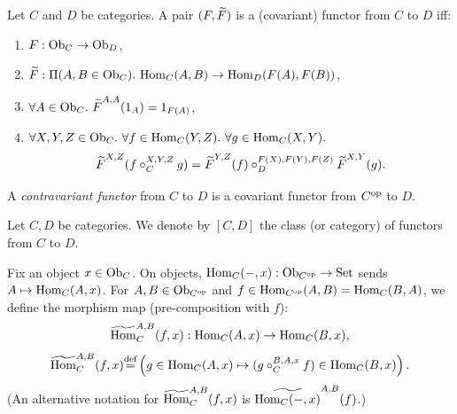 \documentclass[10pt,a4paper]{article}
\begin{document}
\begin{definition}
Let $C$ and $D$ be categories. A pair $(F, {\widetilde{F}\textrm{}})$ is a (covariant) functor from $C$ to $D$ iff:
\begin{enumerate}
\item $F : {\textrm{Ob}}_C \to {\textrm{Ob}}_D$,
\item $\FMor : \Pi(A, B \in \Ob_C).\ \Hom_C(A,B) \to \Hom_D(F(A), F(B))$,
\item $\forall A\in \Ob_C.\ \FMor^{A,A}(1_A)=1_{F(A)}$,
\item $\forall X,Y,Z \in {\textrm{Ob}}_C.\ \forall f\in{\textrm{Hom}}_C(Y,Z).\ \forall g\in{\textrm{Hom}}_C(X,Y).$
$${\widetilde{F}\textrm{}}^{X,Z}(f\circ_C^{X,Y,Z} g)={\widetilde{F}\textrm{}}^{Y,Z}(f)\circ_D^{F(X),F(Y),F(Z)} {\widetilde{F}\textrm{}}^{X,Y}(g).$$
\end{enumerate}
A \emph{contravariant functor} from $C$ to $D$ is a covariant functor from $C^{\textrm{op}}$ to $D$.
\end{definition}

\begin{definition}
Let $C, D$ be categories. We denote by $[C,D]$ the class (or category) of functors from $C$ to $D$.
\end{definition}

\begin{definition}
Fix an object $x \in {\textrm{Ob}}_C$. On objects, ${\textrm{Hom}}_C(-,x) : {\textrm{Ob}}_{C^{\textrm{op}}} \to {\textrm{Set}}$ sends $A \mapsto {\textrm{Hom}}_C(A,x)$.
For $A,B \in {\textrm{Ob}}_{C^{\textrm{op}}}$ and $f \in {\textrm{Hom}}_{C^{\textrm{op}}}(A,B) = {\textrm{Hom}}_C(B,A)$, we define the morphism map (pre-composition with $f$):
$${\widetilde{{\textrm{Hom}}}\textrm{}}^{A,B}_C(f,x) : {\textrm{Hom}}_C(A,x) \to {\textrm{Hom}}_C(B,x),$$
$${\widetilde{{\textrm{Hom}}}\textrm{}}^{A,B}_C(f,x) {\stackrel{{\textrm{def}}}{=}} \left(g \in {\textrm{Hom}}_C(A,x) \mapsto (g \circ_C^{B,A,x} f) \in {\textrm{Hom}}_C(B,x)\right).$$
(An alternative notation for ${\widetilde{{\textrm{Hom}}}\textrm{}}^{A,B}_C(f,x)$ is $\widetilde{{\textrm{Hom}}_C(-,x)}^{A,B}(f)$.)
\end{definition}
\end{document}
